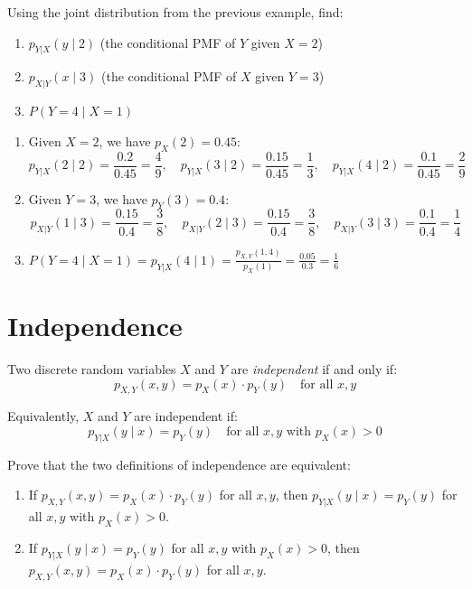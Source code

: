\begin{eg}
Using the joint distribution from the previous example, find:
\begin{enumerate}[label=(\alph*)]
    \item $p_{Y|X}(y \mid 2)$ (the conditional PMF of $Y$ given $X = 2$)
    \item $p_{X|Y}(x \mid 3)$ (the conditional PMF of $X$ given $Y = 3$)
    \item $P(Y = 4 \mid X = 1)$
\end{enumerate}

\begin{solution}
\begin{enumerate}[label=(\alph*)]
    \item Given $X = 2$, we have $p_X(2) = 0.45$:
    \[
    p_{Y|X}(2 \mid 2) = \frac{0.2}{0.45} = \frac{4}{9}, \quad p_{Y|X}(3 \mid 2) = \frac{0.15}{0.45} = \frac{1}{3}, \quad p_{Y|X}(4 \mid 2) = \frac{0.1}{0.45} = \frac{2}{9}
    \]
    
    \item Given $Y = 3$, we have $p_Y(3) = 0.4$:
    \[
    p_{X|Y}(1 \mid 3) = \frac{0.15}{0.4} = \frac{3}{8}, \quad p_{X|Y}(2 \mid 3) = \frac{0.15}{0.4} = \frac{3}{8}, \quad p_{X|Y}(3 \mid 3) = \frac{0.1}{0.4} = \frac{1}{4}
    \]
    
    \item $P(Y = 4 \mid X = 1) = p_{Y|X}(4 \mid 1) = \frac{p_{X,Y}(1, 4)}{p_X(1)} = \frac{0.05}{0.3} = \frac{1}{6}$
\end{enumerate}
\end{solution}
\end{eg}

\section{Independence}

\begin{definition}[Independence]
Two discrete random variables $X$ and $Y$ are \emph{independent} if and only if:
\[
p_{X,Y}(x, y) = p_X(x) \cdot p_Y(y) \quad \text{for all } x, y
\]

Equivalently, $X$ and $Y$ are independent if:
\[
p_{Y|X}(y \mid x) = p_Y(y) \quad \text{for all } x, y \text{ with } p_X(x) > 0
\]
\end{definition}

\begin{exercise}
Prove that the two definitions of independence are equivalent:
\begin{enumerate}[label=(\alph*)]
    \item If $p_{X,Y}(x, y) = p_X(x) \cdot p_Y(y)$ for all $x, y$, then $p_{Y|X}(y \mid x) = p_Y(y)$ for all $x, y$ with $p_X(x) > 0$.
    \item If $p_{Y|X}(y \mid x) = p_Y(y)$ for all $x, y$ with $p_X(x) > 0$, then $p_{X,Y}(x, y) = p_X(x) \cdot p_Y(y)$ for all $x, y$.
\end{enumerate}
\end{exercise}

